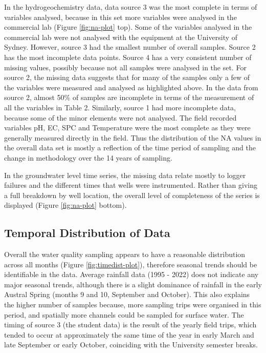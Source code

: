 \documentclass[, manuscript]{copernicus}
\begin{document}
In the hydrogeochemistry data, data source 3 was the most complete in
terms of variables analysed, because in this set more variables were
analysed in the commercial lab (Figure \ref{fig:na-plot} top). Some of
the variables analysed in the commercial lab were not analysed with the
equipment at the University of Sydney. However, source 3 had the
smallest number of overall samples. Source 2 has the most incomplete
data points. Source 4 has a very consistent number of missing values,
possibly because not all samples were analysed in the set. For source 2,
the missing data suggests that for many of the samples only a few of the
variables were measured and analysed as highlighted above. In the data
from source 2, almost 50\% of samples are incomplete in terms of the
measurement of all the variables in Table 2. Similarly, source 1 had
more incomplete data, because some of the minor elements were not
analysed. The field recorded variables pH, EC, SPC and Temperature were
the most complete as they were generally measured directly in the field.
Thus the distribution of the NA values in the overall data set is mostly
a reflection of the time period of sampling and the change in
methodology over the 14 years of sampling.

In the groundwater level time series, the missing data relate mostly to
logger failures and the different times that wells were instrumented.
Rather than giving a full breakdown by well location, the overall level
of completeness of the series is displayed (Figure \ref{fig:na-plot}
bottom).

\subsection{Temporal Distribution of Data}

Overall the water quality sampling appears to have a reasonable
distribution across all months (Figure \ref{fig:timedist-plot}),
therefore seasonal trends should be identifiable in the data. Average
rainfall data (1995 - 2022) does not indicate any major seasonal trends,
although there is a slight dominance of rainfall in the early Austral
Spring (months 9 and 10, September and October). This also explains the
higher number of samples because, more sampling trips were organised in
this period, and spatially more channels could be sampled for surface
water. The timing of source 3 (the student data) is the result of the
yearly field trips, which tended to occur at approximately the same time
of the year in early March and late September or early October,
coinciding with the University semester breaks.
\end{document}

